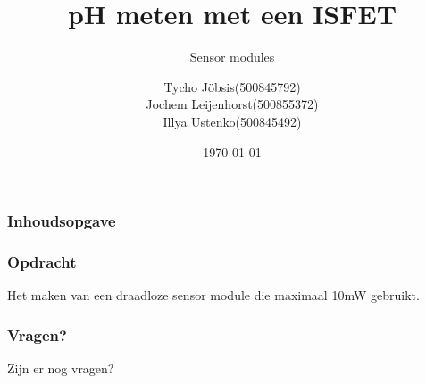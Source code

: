 \documentclass[compress]{beamer}
\institute{HvA}
\date{\today}
\begin{document}
\title{pH meten met een ISFET}
\subtitle{Sensor modules}
\author[Tycho Jöbsis \and Jochem Leijenhorst \and Illya Ustenko]{
    {
        \begin{tabular}{ll}
            Tycho Jöbsis        & (500845792)\tabularnewline
            Jochem Leijenhorst  & (500855372)\tabularnewline
            Illya Ustenko       & (500845492)        
        \end{tabular}
    }
}

    \begin{frame}
        \titlepage
    \end{frame}
    
    \begin{frame}
        \frametitle{Inhoudsopgave}\tableofcontents
    \end{frame} 

    \begin{frame}
        \frametitle{Opdracht}
    
        Het maken van een draadloze sensor module die maximaal 10mW gebruikt.
    
    \end{frame}

    

    

    

    

    \begin{frame}
        \frametitle{Vragen?}
        
        \centering
        Zijn er nog vragen?
    
    \end{frame}
\end{document}
